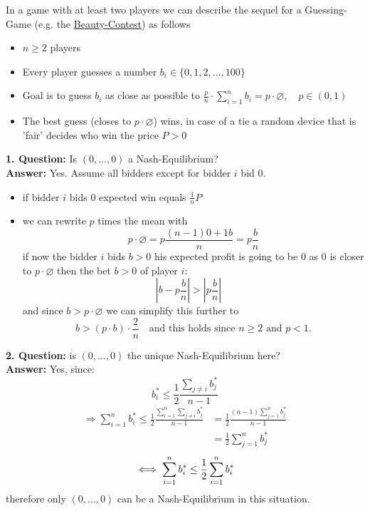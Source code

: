 \begin{example}  \label{Guessing-Game}
	In a game with at least two players we can describe the sequel for a Guessing-Game (e.g. the \hyperref[Beauty-Contest]{Beauty-Contest}) as follows
	\begin{itemize}
		\item $n \geq 2$ players
		\item Every player guesses a number $b_{i} \in \{0, 1, 2, \dotsc, 100 \}$
		\item Goal is to guess $b_{i}$ as close as possible to $\frac{p}{n} \cdot \sum_{i = 1}^{n} b_{i} = p \cdot \varnothing, \quad p \in (0, 1)$
		\item The best guess (closes to $p \cdot \varnothing$) wins, in case of a tie a random device that is 'fair' decides who win the price $P > 0$
	\end{itemize}
	
	
	\textbf{1. Question:} Is $(0, \dotsc, 0)$ a Nash-Equilibrium? \\
	\textbf{Answer:} Yes. Assume all bidders except for bidder $i$ bid $0$.	
		\begin{itemize}
			\item if bidder $i$ bids $0$ expected win equals $\frac{1}{n} P $
			\item we can rewrite $p$ times the mean with	
				\[ p \cdot \varnothing = p \frac{(n - 1)0 + 1 b}{n} = p \frac{b}{n} \]
			if now the bidder $i$ bids $b > 0$ his expected profit is going to be $0$ as $0$ is closer to $p \cdot \varnothing$ then the bet $b > 0$ of player $i$:
				\[ \left| b - p \frac{b}{n} \right| > \left| p \frac{b}{n} \right| \quad \]
			and since $b > p \cdot \varnothing$ we can simplify this further to
			\[ b > \left( p \cdot b \right) \cdot \frac{2}{n} \quad \text{and this holds since } n \geq 2 \text{ and } p < 1.\]
		\end{itemize}
		
	
	\textbf{2. Question:} is $(0, \dotsc, 0)$ the unique Nash-Equilibrium here? \\
	\textbf{Answer:} Yes, since:	
	\[ b_{i}^{*} \leq \frac{1}{2} \frac{\sum_{j \neq i} b_{j}^{*}}{n - 1} \]
	\begin{align*}
		\Rightarrow \sum_{i = 1}^{n} b_{i}^{*} \leq \frac{1}{2} \frac{\sum_{i = 1}^{n} \sum_{j \neq i} b_{j}^{*}}{n - 1} & = \frac{1}{2} \frac{(n - 1) \sum_{j = 1}^{n} b_{j}^{*}}{n - 1} \\
		& = \frac{1}{2} \sum_{j = 1}^{n} b_{j}^{*}
	\end{align*} 
	\[ \iff \sum_{i = 1}^{n} b_{i}^{*} \leq \frac{1}{2} \sum_{i = 1}^{n} b_{i}^{*} \]
	therefore only $(0, \dotsc,  0)$ can be a Nash-Equilibrium in this situation. \\



\end{example}
